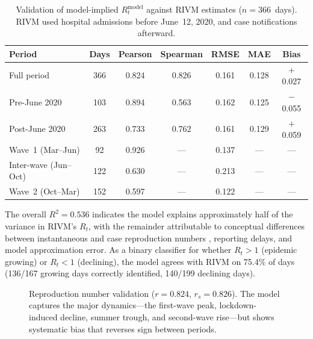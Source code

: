 \documentclass[11pt]{article}
\begin{document}
\begin{table}[ht]
\centering\small
\caption{Validation of model-implied $R_t^{\mathrm{model}}$ against RIVM estimates ($n=366$~days). RIVM used hospital admissions before June~12, 2020, and case notifications afterward.}
\label{tab:rt-metrics}
\begin{tabular}{lcccccc}
\toprule
Period & Days & Pearson & Spearman & RMSE & MAE & Bias \\
\midrule
Full period     & 366 & 0.824 & 0.826 & 0.161 & 0.128 & $+$0.027 \\
Pre-June 2020   & 103 & 0.894 & 0.563 & 0.162 & 0.125 & $-$0.055 \\
Post-June 2020  & 263 & 0.733 & 0.762 & 0.161 & 0.129 & $+$0.059 \\
\midrule
Wave~1 (Mar--Jun) &  92 & 0.926 & --- & 0.137 & --- & --- \\
Inter-wave (Jun--Oct) & 122 & 0.630 & --- & 0.213 & --- & --- \\
Wave~2 (Oct--Mar)  & 152 & 0.597 & --- & 0.122 & --- & --- \\
\bottomrule
\end{tabular}
\end{table}

The overall $R^2=0.536$ indicates the model explains approximately half of the variance in RIVM's $R_t$, with the remainder attributable to conceptual differences between instantaneous and case reproduction numbers \citep{Gostic2020,Vegvari2022}, reporting delays, and model approximation error. As a binary classifier for whether $R_t>1$ (epidemic growing) or $R_t<1$ (declining), the model agrees with RIVM on 75.4\% of days (136/167 growing days correctly identified, 140/199 declining days).

\begin{figure}[ht]
\centering
{}
\caption{Reproduction number validation ($r=0.824$, $r_s=0.826$). The model captures the major dynamics---the first-wave peak, lockdown-induced decline, summer trough, and second-wave rise---but shows systematic bias that reverses sign between periods.}\label{fig:rt}
\end{figure}
\end{document}
